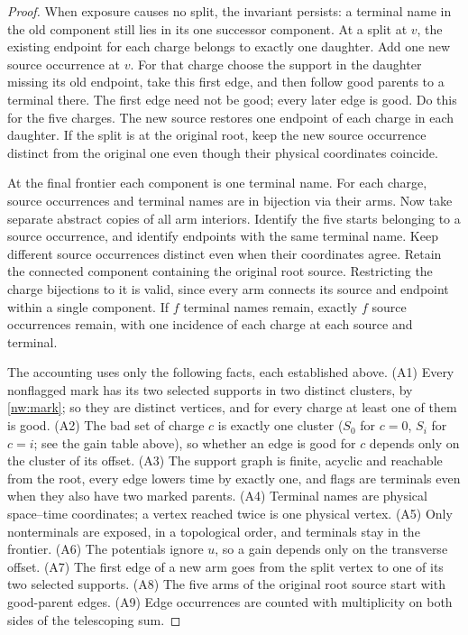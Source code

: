 \begin{proof}
When exposure causes no split, the invariant persists: a terminal name in the old component still lies in its one successor component. At a split at $v$, the existing endpoint for each charge belongs to exactly one daughter. Add one new source occurrence at $v$. For that charge choose the support in the daughter missing its old endpoint, take this first edge, and then follow good parents to a terminal there. The first edge need not be good; every later edge is good. Do this for the five charges. The new source restores one endpoint of each charge in each daughter. If the split is at the original root, keep the new source occurrence distinct from the original one even though their physical coordinates coincide.

At the final frontier each component is one terminal name. For each charge, source occurrences and terminal names are in bijection via their arms. Now take separate abstract copies of all arm interiors. Identify the five starts belonging to a source occurrence, and identify endpoints with the same terminal name. Keep different source occurrences distinct even when their coordinates agree. Retain the connected component containing the original root source. Restricting the charge bijections to it is valid, since every arm connects its source and endpoint within a single component. If $f$ terminal names remain, exactly $f$ source occurrences remain, with one incidence of each charge at each source and terminal.

The accounting uses only the following facts, each established above.
(A1) Every nonflagged mark has its two selected supports in two distinct clusters, by \eqref{nw:mark};
so they are distinct vertices, and for every charge at least one of them is good.
(A2) The bad set of charge $c$ is exactly one cluster ($S_0$ for $c=0$, $S_i$ for $c=i$; see the gain table above), so
whether an edge is good for $c$ depends only on the cluster of its offset.
(A3) The support graph is finite, acyclic and reachable from the root, every edge lowers time by
exactly one, and flags are terminals even when they also have two marked parents.
(A4) Terminal names are physical space--time coordinates; a vertex reached twice is one physical vertex.
(A5) Only nonterminals are exposed, in a topological order, and terminals stay in the frontier.
(A6) The potentials ignore $u$, so a gain depends only on the transverse offset.
(A7) The first edge of a new arm goes from the split vertex to one of its two selected supports.
(A8) The five arms of the original root source start with good-parent edges.
(A9) Edge occurrences are counted with multiplicity on both sides of the telescoping sum.


\end{proof}
